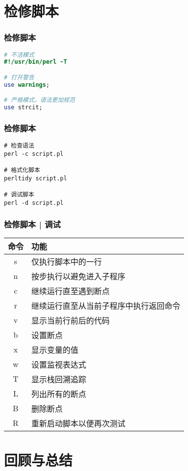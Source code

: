\section{检修脚本}
\begin{frame}[fragile]
  \frametitle{\alert{检修脚本}}
\begin{lstlisting}[language=Perl]
# 不洁模式
#!/usr/bin/perl -T

# 打开警告
use warnings;

# 严格模式，语法更加规范
use strcit;
\end{lstlisting}
\end{frame}

\begin{frame}[fragile]
  \frametitle{\alert{检修脚本}}
\begin{lstlisting}
# 检查语法
perl -c script.pl

# 格式化脚本
perltidy script.pl

# 调试脚本
perl -d script.pl
\end{lstlisting}
\end{frame}

\begin{frame}
  \frametitle{检修脚本 | 调试}
  \begin{table}
    \centering
    \begin{tabularx}{0.8\textwidth}{cX}
      \hline
      \rowcolor{blue!50}命令 & 功能\\
      \hline
      s & 仅执行脚本中的一行\\
      n & 按步执行以避免进入子程序\\
      c & 继续运行直至遇到断点\\
      r & 继续运行直至从当前子程序中执行返回命令\\
      v & 显示当前行前后的代码\\
      b & 设置断点\\
      x & 显示变量的值\\
      w & 设置监视表达式\\
      T & 显示栈回溯追踪\\
      L & 列出所有的断点\\
      B & 删除断点\\
      R & 重新启动脚本以便再次测试\\
      \hline
    \end{tabularx}
  \end{table}
\end{frame}


\section{回顾与总结}
